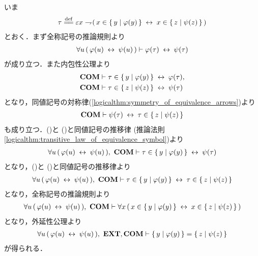 	\begin{sketch}
		いま
		\begin{align}
			\tau \defeq \varepsilon x \negation (\, x \in \Set{y}{\varphi(y)} \lrarrow x \in \Set{z}{\psi(z)}\, )
		\end{align}
		とおく．まず全称記号の推論規則より
		\begin{align}
			\forall u\, (\, \varphi(u) \hspace{0.25em}\leftrightarrow\hspace{0.25em} \psi(u)\, )
			\vdash \varphi(\tau) \hspace{0.25em}\leftrightarrow\hspace{0.25em} \psi(\tau)
			\label{fom:equivalent_formula_rewriting_6_1}
		\end{align}
		が成り立つ．また内包性公理より
		\begin{align}
			\mbox{\bf COM} &\vdash \tau \in \left\{\, y \mid \varphi(y)\, \right\} \hspace{0.25em}\leftrightarrow\hspace{0.25em} \varphi(\tau), 
			\label{fom:equivalent_formula_rewriting_6_2} \\
			\mbox{\bf COM} &\vdash \tau \in \left\{\, z \mid \psi(z)\, \right\} \hspace{0.25em}\leftrightarrow\hspace{0.25em} \psi(\tau)
		\end{align}
		となり，同値記号の対称律(\ref{logicalthm:symmetry_of_equivalence_arrows})より
		\begin{align}
			\mbox{\bf COM} \vdash \psi(\tau) \hspace{0.25em}\leftrightarrow\hspace{0.25em} \tau \in \left\{\, z \mid \psi(z)\, \right\}
			\label{fom:equivalent_formula_rewriting_6_3}
		\end{align}
		も成り立つ．()と
		()と同値記号の推移律
		(推論法則\ref{logicalthm:transitive_law_of_equivalence_symbol})より
		\begin{align}
			\forall u\, (\, \varphi(u) \hspace{0.25em}\leftrightarrow\hspace{0.25em} \psi(u)\, ),\ \mbox{\bf COM} \vdash
			\tau \in \left\{\, y \mid \varphi(y)\, \right\} \hspace{0.25em}\leftrightarrow\hspace{0.25em} \psi(\tau)
			\label{fom:equivalent_formula_rewriting_6_4}
		\end{align}
		となり，()と
		()と同値記号の推移律より
		\begin{align}
			\forall u\, (\, \varphi(u) \hspace{0.25em}\leftrightarrow\hspace{0.25em} \psi(u)\, ),\ \mbox{\bf COM} \vdash
			\tau \in \left\{\, y \mid \varphi(y)\, \right\} \hspace{0.25em}\leftrightarrow\hspace{0.25em} \tau \in \left\{\, z \mid \psi(z)\, \right\}
		\end{align}
		となり，全称記号の推論規則より
		\begin{align}
			\forall u\, (\, \varphi(u) \hspace{0.25em}\leftrightarrow\hspace{0.25em} \psi(u)\, ),\ \mbox{\bf COM} \vdash
			\forall x\, (\, x \in \left\{\, y \mid \varphi(y)\, \right\} \hspace{0.25em}\leftrightarrow\hspace{0.25em} x \in \left\{\, z \mid \psi(z)\, \right\}\, )
		\end{align}
		となり，外延性公理より
		\begin{align}
			\forall u\, (\, \varphi(u) \lrarrow \psi(u)\, ),\ \EXTAX,\COMAX \vdash
			\Set{y}{\varphi(y)} = \Set{z}{\psi(z)}
		\end{align}
		が得られる．
		\QED
	\end{sketch}
	
